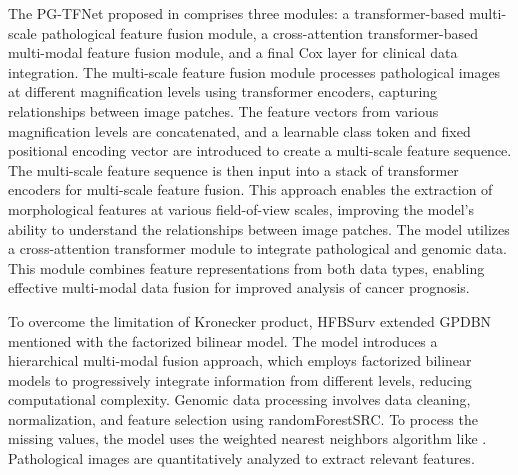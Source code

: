 \documentclass[journal,twoside,web]{ieeecolor}
\begin{document}
The PG-TFNet proposed in \cite{lv2021pg} comprises three modules: a transformer-based multi-scale pathological feature fusion module, a cross-attention transformer-based multi-modal feature fusion module, and a final Cox layer for clinical data integration. 
The multi-scale feature fusion module processes pathological images at different magnification levels using transformer encoders, capturing relationships between image patches. 
The feature vectors from various magnification levels are concatenated, and a learnable class token and fixed positional encoding vector are introduced to create a multi-scale feature sequence. 
The multi-scale feature sequence is then input into a stack of transformer encoders for multi-scale feature fusion. 
This approach enables the extraction of morphological features at various field-of-view scales, improving the model's ability to understand the relationships between image patches.
The model utilizes a cross-attention transformer module to integrate pathological and genomic data. 
This module combines feature representations from both data types, enabling effective multi-modal data fusion for improved analysis of cancer prognosis.

To overcome the limitation of Kronecker product, HFBSurv extended GPDBN\cite{wang2021gpdbn} mentioned with the factorized bilinear model.
The model introduces a hierarchical multi-modal fusion approach, which employs factorized bilinear models to progressively integrate information from different levels, reducing computational complexity.  
Genomic data processing involves data cleaning, normalization, and feature selection using randomForestSRC\cite{yu2019breast}.
To process the missing values, the model uses the weighted nearest neighbors algorithm like \cite{ding2016evaluating}.
Pathological images are quantitatively analyzed to extract relevant features. 
\end{document}
